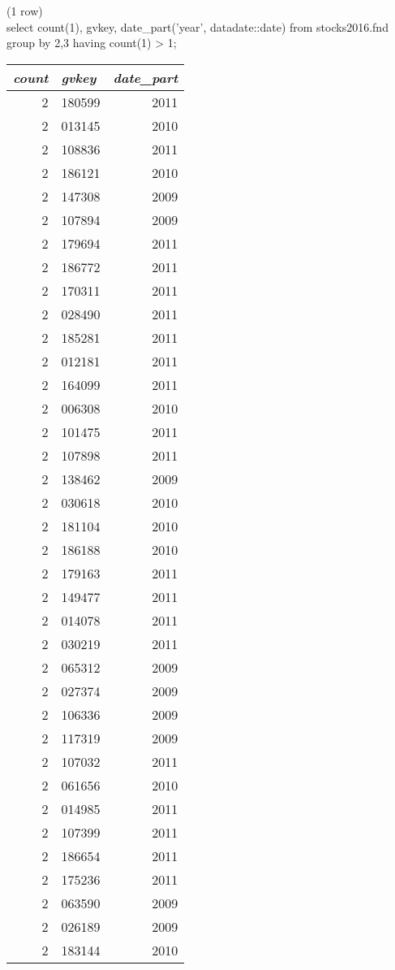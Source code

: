 \noindent (1 row) \\

select count(1), gvkey, date_part('year', datadate::date)
from stocks2016.fnd
group by 2,3
having count(1) > 1;
\begin{tabular}{r | l | r}
\textit{count} & \textit{gvkey} & \textit{date\_part} \\
\hline
2 & 180599 & 2011 \\
2 & 013145 & 2010 \\
2 & 108836 & 2011 \\
2 & 186121 & 2010 \\
2 & 147308 & 2009 \\
2 & 107894 & 2009 \\
2 & 179694 & 2011 \\
2 & 186772 & 2011 \\
2 & 170311 & 2011 \\
2 & 028490 & 2011 \\
2 & 185281 & 2011 \\
2 & 012181 & 2011 \\
2 & 164099 & 2011 \\
2 & 006308 & 2010 \\
2 & 101475 & 2011 \\
2 & 107898 & 2011 \\
2 & 138462 & 2009 \\
2 & 030618 & 2010 \\
2 & 181104 & 2010 \\
2 & 186188 & 2010 \\
2 & 179163 & 2011 \\
2 & 149477 & 2011 \\
2 & 014078 & 2011 \\
2 & 030219 & 2011 \\
2 & 065312 & 2009 \\
2 & 027374 & 2009 \\
2 & 106336 & 2009 \\
2 & 117319 & 2009 \\
2 & 107032 & 2011 \\
2 & 061656 & 2010 \\
2 & 014985 & 2011 \\
2 & 107399 & 2011 \\
2 & 186654 & 2011 \\
2 & 175236 & 2011 \\
2 & 063590 & 2009 \\
2 & 026189 & 2009 \\
2 & 183144 & 2010 \\

\end{tabular}
